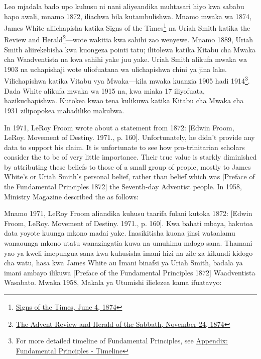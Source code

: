 Leo mjadala bado upo kuhusu ni nani aliyeandika muhtasari hiyo kwa sababu hapo awali, mnamo 1872, iliachwa bila kutambulishwa. Mnamo mwaka wa 1874, James White aliichapisha katika Signs of the Times\footnote{\href{https://adventistdigitallibrary.org/adl-364148/signs-times-june-4-1874}{Signs of the Times, June 4, 1874}} na Uriah Smith katika the Review and Herald\footnote{\href{http://documents.adventistarchives.org/Periodicals/RH/RH18741124-V44-22.pdf}{The Advent Review and Herald of the Sabbath, November 24, 1874}}—wote wakitia kwa sahihi zao wenyewe. Mnamo 1889, Uriah Smith aliirekebisha kwa kuongeza pointi tatu; ilitolewa katika Kitabu cha Mwaka cha Waadventista na kwa sahihi yake juu yake. Uriah Smith alikufa mwaka wa 1903 na uchapishaji wote uliofuatana wa  ulichapishwa chini ya jina lake. Vilichapishwa katika Vitabu vya Mwaka—kila mwaka kuanzia 1905 hadi 1914\footnote{For more detailed timeline of Fundamental Principles, see \hyperref[appendix:timeline]{Appendix: Fundamental Principles - Timeline}}. Dada White alikufa mwaka wa 1915 na, kwa miaka 17 iliyofuata,  hazikuchapishwa. Kutokea kwao tena kulikuwa katika Kitabu cha Mwaka cha 1931 zilipopokea mabadiliko makubwa.


In 1971, LeRoy Froom wrote about a statement from 1872: [Edwin Froom, LeRoy. Movement of Destiny. 1971., p. 160]. Unfortunately, he didn’t provide any data to support his claim. It is unfortunate to see how pro-trinitarian scholars consider the  to be of very little importance. Their true value is starkly diminished by attributing these beliefs to those of a small group of people, mostly to James White’s or Uriah Smith’s personal belief, rather than belief which was [Preface of the Fundamental Principles 1872] the Seventh-day Adventist people. In 1958, Ministry Magazine described the  as follows:


Mnamo 1971, LeRoy Froom aliandika kuhusu taarifa fulani kutoka 1872: [Edwin Froom, LeRoy. Movement of Destiny. 1971., p. 160]. Kwa bahati mbaya, hakutoa data yoyote kuunga mkono madai yake. Inasikitisha kuona jinsi wataalamu wanaounga mkono utatu wanazingatia  kuwa na umuhimu mdogo sana. Thamani yao ya kweli imepungua sana kwa kuhusisha imani hizi na zile za kikundi kidogo cha watu, hasa kwa James White au Imani binafsi ya Uriah Smith, badala ya imani ambayo ilikuwa [Preface of the Fundamental Principles 1872] Waadventista Wasabato. Mwaka 1958, Makala ya Utumishi ilielezea  kama ifuatavyo:


